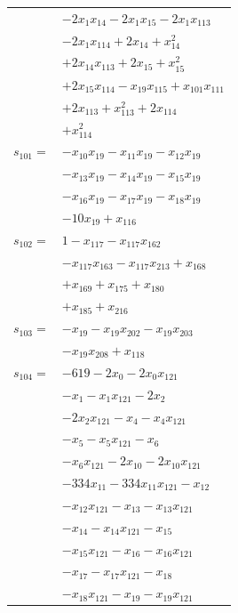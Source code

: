 \begin{longtable}{@{}r@{\;}l@{}}
 & \(\displaystyle -2x_{1}x_{14} -2x_{1}x_{15} -2x_{1}x_{113}\) \\
 & \(\displaystyle -2x_{1}x_{114} +2x_{14} +x_{14}^{2}\) \\
 & \(\displaystyle +2x_{14}x_{113} +2x_{15} +x_{15}^{2}\) \\
 & \(\displaystyle +2x_{15}x_{114} -x_{19}x_{115} +x_{101}x_{111}\) \\
 & \(\displaystyle +2x_{113} +x_{113}^{2} +2x_{114}\) \\
 & \(\displaystyle +x_{114}^{2}\) \\[3pt]
\(s_{101}=\) & \(\displaystyle -x_{10}x_{19} -x_{11}x_{19} -x_{12}x_{19}\) \\
 & \(\displaystyle -x_{13}x_{19} -x_{14}x_{19} -x_{15}x_{19}\) \\
 & \(\displaystyle -x_{16}x_{19} -x_{17}x_{19} -x_{18}x_{19}\) \\
 & \(\displaystyle -10x_{19} +x_{116}\) \\[3pt]
\(s_{102}=\) & \(\displaystyle 1 -x_{117} -x_{117}x_{162}\) \\
 & \(\displaystyle -x_{117}x_{163} -x_{117}x_{213} +x_{168}\) \\
 & \(\displaystyle +x_{169} +x_{175} +x_{180}\) \\
 & \(\displaystyle +x_{185} +x_{216}\) \\[3pt]
\(s_{103}=\) & \(\displaystyle -x_{19} -x_{19}x_{202} -x_{19}x_{203}\) \\
 & \(\displaystyle -x_{19}x_{208} +x_{118}\) \\[3pt]
\(s_{104}=\) & \(\displaystyle -619 -2x_{0} -2x_{0}x_{121}\) \\
 & \(\displaystyle -x_{1} -x_{1}x_{121} -2x_{2}\) \\
 & \(\displaystyle -2x_{2}x_{121} -x_{4} -x_{4}x_{121}\) \\
 & \(\displaystyle -x_{5} -x_{5}x_{121} -x_{6}\) \\
 & \(\displaystyle -x_{6}x_{121} -2x_{10} -2x_{10}x_{121}\) \\
 & \(\displaystyle -334x_{11} -334x_{11}x_{121} -x_{12}\) \\
 & \(\displaystyle -x_{12}x_{121} -x_{13} -x_{13}x_{121}\) \\
 & \(\displaystyle -x_{14} -x_{14}x_{121} -x_{15}\) \\
 & \(\displaystyle -x_{15}x_{121} -x_{16} -x_{16}x_{121}\) \\
 & \(\displaystyle -x_{17} -x_{17}x_{121} -x_{18}\) \\
 & \(\displaystyle -x_{18}x_{121} -x_{19} -x_{19}x_{121}\) \\

\end{longtable}

